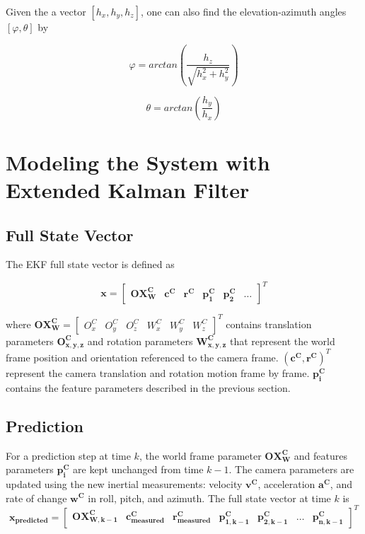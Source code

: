 \noindent Given the a vector $[h_x, h_y, h_z]$, one can also find the
elevation-azimuth angles $[\varphi, \theta]$ by

\begin{equation}
\label{eq:m_inv_varphi}
\varphi 
=arctan\left(\frac{h_{z}}{\sqrt{h_x^2+h_y^2}}\right)
\end{equation}

\begin{equation}
\label{eq:m_inv_theta}
\theta =arctan\left(\frac{h_{y}}{h_{x}}\right)
\end{equation}


\section{Modeling the System with Extended Kalman 
Filter}

\subsection{Full State Vector}

The EKF full state vector is defined as 

\begin{equation}
\mathbf{x}=\begin{bmatrix}
\mathbf{OX_{W}^{C}} & \mathbf{c^{C}} & \mathbf{r^{C}} & 
\mathbf{p_{1}^{C}} & \mathbf{p_{2}^{C}} & \ldots 
\end{bmatrix}^T
\end{equation}

\noindent where $\mathbf{OX_{W}^{C}}= \begin{bmatrix}O_{x}^{C} &
  O_{y}^{C} & O_{z}^{C} & W_{x}^{C} & W_{y}^{C} &
  W_{z}^{C} \end{bmatrix}^{T}$ contains translation parameters
$\mathbf{O_{x,y,z}^{C}}$ and rotation parameters
$\mathbf{W_{x,y,z}^{C}}$ that represent the world frame position and
orientation referenced to the camera frame.
$\left(\mathbf{c^{C}},\mathbf{r^{C}}\right)^{T}$ represent the camera
translation and rotation motion frame by frame. $\mathbf{p_{i}^{C}}$
contains the feature parameters described in the previous section.

\subsection{Prediction}

For a prediction step at time $k$, the world frame parameter
$\mathbf{OX_W^C}$ and features parameters $\mathbf{p_i^C}$ are kept
unchanged from time $k-1$. The camera parameters are updated using the
new inertial measurements: velocity $\mathbf{v^{C}}$, acceleration
$\mathbf{a^{C}}$, and rate of change $\mathbf{w^{C}}$ in roll, pitch, and
azimuth. The full state vector at time $k$ is
\begin{equation}
\mathbf{x_{predicted}}
=\begin{bmatrix}
\mathbf{OX_{W,k-1}^{C}} & 
\mathbf{c_{measured}^{C}} &
\mathbf{r_{measured}^{C}} & 
\mathbf{p_{1,k-1}^{C}} & 
\mathbf{p_{2,k-1}^{C}} & 
\ldots & 
\mathbf{p_{n,k-1}^C}
\end{bmatrix}^T
\end{equation}

